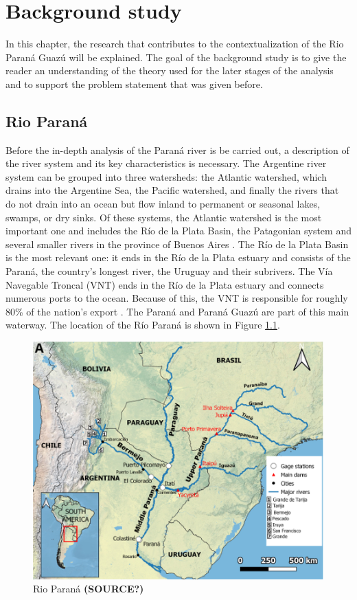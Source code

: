\chapter{Background study}
\label{chapter:background}
In this chapter, the research that contributes to the contextualization of the Rio Paraná Guazú will be explained. The goal of the background study is to give the reader an understanding of the theory used for the later stages of the analysis and to support the problem statement that was given before.

\section{Rio Paraná}
Before the in-depth analysis of the Paraná river is be carried out, a description of the river system and its key characteristics is necessary. The Argentine river system can be grouped into three watersheds: the Atlantic watershed, which drains into the Argentine Sea, the Pacific watershed, and finally the rivers that do not drain into an ocean but flow inland to permanent or seasonal lakes, swamps, or dry sinks. Of these systems, the Atlantic watershed is the most important one and includes the Río de la Plata Basin, the Patagonian system and several smaller rivers in the province of Buenos Aires \autocite{farberHydrographyArgentina2024}. The Río de la Plata Basin is the most relevant one: it ends in the Río de la Plata estuary and consists of the Paraná, the country's longest river, the Uruguay and their subrivers. The Vía Navegable Troncal (VNT) ends in the Río de la Plata estuary and connects numerous ports to the ocean. Because of this, the VNT is responsible for roughly 80\% of the nation's export \autocite{agencianacionaldepuertosynavegacionNavegableTroncal2025}. The Paraná and Paraná Guazú are part of this main waterway. The location of the Río Paraná is shown in Figure \ref{fig:rio parana map}.

\begin{figure}[h]
    \centering    \includegraphics[width=0.65\linewidth]{figures/ch2/map rio parana.png}
    \caption{Rio Paraná  \textbf{(SOURCE?)}}
    \label{fig:rio parana map}
\end{figure}

